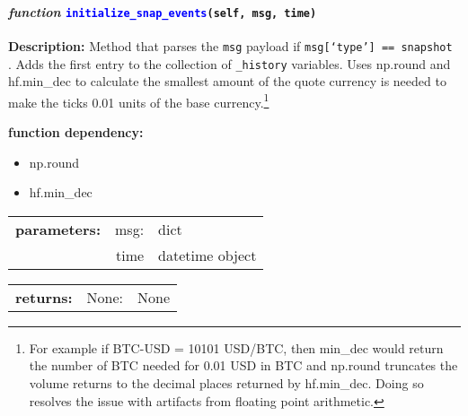 \paragraph{\textit{function} \textcolor{blue}{\texttt{initialize\_snap\_events}}\texttt{(self, msg, time)}}\hfill\break
\noindent\textbf{Description:} Method that parses the \texttt{msg} payload if \texttt{msg[`type'] == snapshot }. Adds the first entry to the collection of \texttt{\_history} variables. Uses np.round and hf.min\_dec to calculate the smallest amount of the quote currency is needed to make the ticks 0.01 units of the base currency.\footnote{For example if BTC-USD = 10101 USD/BTC, then min\_dec would return the number of BTC needed for 0.01 USD in BTC and np.round truncates the volume returns to the decimal places returned by hf.min\_dec. Doing so resolves the issue with artifacts from floating point arithmetic.}

\textbf{function dependency:}
\begin{itemize}
	\item np.round
	\item hf.min\_dec
\end{itemize}

\begin{tabular}{r r l }
	\textbf{parameters:}	& msg: & dict\\
	&time& datetime object\\ 
\end{tabular}

\begin{tabular}{r r l}
	\textbf{returns:} & None: & None\\
\end{tabular}

